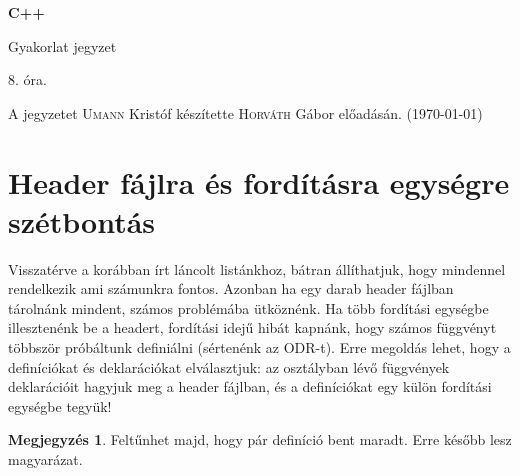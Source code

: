\documentclass[a4paper,11.5pt]{article}
\begin{document}
	\setlength\parindent{0pt}
	\def\s{\hspace{0.2mm}\vphantom{\beta}}
	\def\Z{\mathbb{Z}}
	\def\Q{\mathbb{Q}}
	\def\R{\mathbb{R}}
	\def\C{\mathbb{C}}
	\def\N{\mathbb{N}}
	\def\Ra{\overline{\mathbb{R}}}
	
	\def\sume{\displaystyle\sum_{n=1}^{+\infty}}
	\def\sumn{\displaystyle\sum_{n=0}^{+\infty}}
	
	\def\narrow{\underset{n\rightarrow+\infty}{\longrightarrow}}
	\def\limn{\displaystyle\lim_{n\to +\infty}}
	\def\limx{\displaystyle\lim_{x\to +\infty}}
	
	\theoremstyle{definition}
	\newtheorem{theorem}{Tétel}[subsection] 
	
	\theoremstyle{definition}
	\newtheorem{definition}[theorem]{Definíció} 
	\newtheorem{example}[theorem]{Példa} 
	\newtheorem{task}[theorem]{Feladat} 
	\newtheorem{note}[theorem]{Megjegyzés}
	\begin{center}
		{\LARGE\textbf{C++}}
		
		{\Large Gyakorlat jegyzet}
		
		8. óra.
	\end{center}
	A jegyzetet \textsc{Umann} Kristóf készítette \textsc{Horváth} Gábor  előadásán. (\today)
	\section{Header fájlra és fordításra egységre szétbontás}
	Visszatérve a korábban írt láncolt listánkhoz, bátran állíthatjuk, hogy mindennel rendelkezik ami számunkra fontos. Azonban ha egy darab header fájlban tárolnánk mindent, számos problémába ütköznénk. Ha több fordítási egységbe illesztenénk be a headert, fordítási idejű hibát kapnánk, hogy számos függvényt többször próbáltunk definiálni (sértenénk az ODR-t). Erre megoldás lehet, hogy a definíciókat és deklarációkat elválasztjuk: az osztályban lévő függvények deklarációit hagyjuk meg a header fájlban, és a definíciókat egy külön fordítási egységbe tegyük!
	
	\begin{note}
		Feltűnhet majd, hogy pár definíció bent maradt. Erre később lesz magyarázat.
	\end{note}
	
\end{document}
